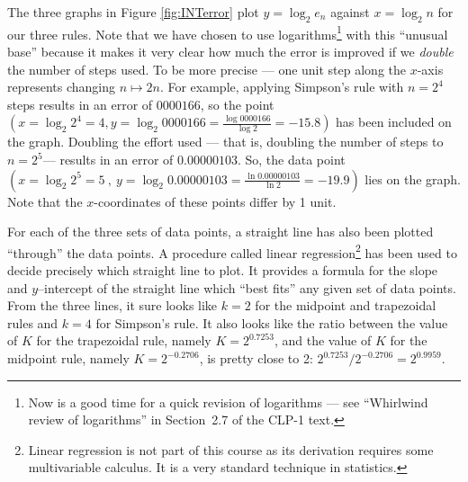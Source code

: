 The three graphs in Figure \ref{fig:INTerror} plot $y=\log_2 e_n$
against $x=\log_2 n$ for our three rules. Note that we have chosen to use
logarithms\footnote{Now is a good time for a quick revision of logarithms --- see
``Whirlwind review of logarithms'' in Section~2.7 of the CLP-1 text.} with
this ``unusual base'' because it makes it very clear how much the error is improved if we
\emph{double} the number of steps used. To be more precise --- one unit step along the
$x$-axis represents changing $n \mapsto 2n$. For example, applying Simpson's rule with
$n=2^4$ steps results in an error of $0000166$, so the point $(x=\log_2 2^4=4, y=\log_2
0000166 = \frac{\log 0000166}{\log 2} = -15.8)$ has been included on the graph. Doubling
the effort used --- that is, doubling the number of steps to $n=2^5$--- results in an
error of $0.00000103$. So, the data point $(x=\log_2 2^5=5\ ,\  y=\log_2 0.00000103
=\frac{\ln 0.00000103}{\ln 2}=-19.9)$ lies on the graph. Note that the $x$-coordinates of
these points differ by 1 unit.


For each of the three sets of data points, a straight line has also
been plotted ``through'' the data points. A procedure called linear
regression\footnote{Linear regression is not part of  this course as its derivation
requires some multivariable calculus. It is a very standard technique in statistics.} has
been used to decide precisely which straight line to plot.
It provides a formula for the slope and $y$--intercept of the straight
line which ``best fits'' any given set of data points. From the three lines,
it sure looks like $k=2$ for the midpoint and trapezoidal rules and
$k=4$ for Simpson's rule.
It also looks like the ratio between the value of $K$ for the trapezoidal rule,
namely $K=2^{0.7253}$, and the value of $K$ for the midpoint rule,
namely $K=2^{-0.2706}$, is pretty close to 2:  $2^{0.7253}/2^{-0.2706}=2^{0.9959}$.

